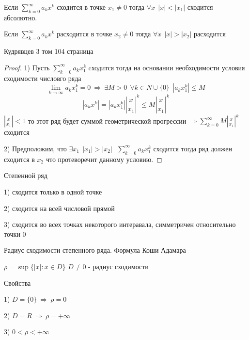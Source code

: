 \begin{theorem}[Абеля]
  Если $\sum_{k=0}^{\infty} a_k x^k$ сходится в точке $x_1 \not= 0$ тогда
  $\forall x ~~ |x| < |x_1|$ сходится абсолютно.

  Если $\sum_{k=0}^{\infty} a_k x^k$ расходится в точке $x_2 \not= 0$ тогда
  $\forall x ~~ |x| > |x_2|$ расходится

  Кудрявцев 3 том 104 страница
\end{theorem}

\begin{proof}
  1) Пусть $\sum_{k = 0}^{\infty}a_k x_1^k$ cходится тогда на основании
  необходимости условия сходимости числовго ряда
  $$
  \lim_{k \to \infty} a_k x_1^k = 0 ~ \Rightarrow ~ \exists M > 0 ~~
  \forall k \in N \cup \{0\} ~~ |a_k x_1^k| \le M
  $$
  $$
  |a_k x^k| = |a_k x_1^k| \left| \frac{x}{x_1} \right|^k \le
  M \left| \frac{x}{x_1} \right|^k
  $$
  $\left| \frac{x}{x_1} \right| < 1$ то этот ряд будет суммой геометрической
  прогрессии $\Rightarrow \sum_{k=0}^{\infty} M \left| \frac{x}{x_1} \right|^k$
  сходится

  2) Предположим, что $\exists x_1 ~~ |x_1| > |x_2| ~~~
  \sum_{k=0}^{\infty} a_k x_1^k$ сходится тогда ряд должен сходится в $x_2$
  что протеворечит данному условию.
\end{proof}

\begin{block}
  Степенной ряд

  1) сходится только в одной точке

  2) сходится на всей числовой прямой

  3) сходится во всех точках некоторого интеравала, симметричен относительно
  точки $0$
\end{block}

\begin{title}[\Large]
  Радиус сходимости степенного ряда. Формула Коши-Адамара
\end{title}

\begin{define}
  $\rho = \sup\{ |x| : x \in D \}$ $D \not= 0$ - радиус сходимости

  Свойства

  1) $D = \{0\} ~ \Rightarrow ~ \rho = 0$

  2) $D = R ~ \Rightarrow ~ \rho = +\infty$

  3) $0 < \rho < +\infty$
\end{define}

